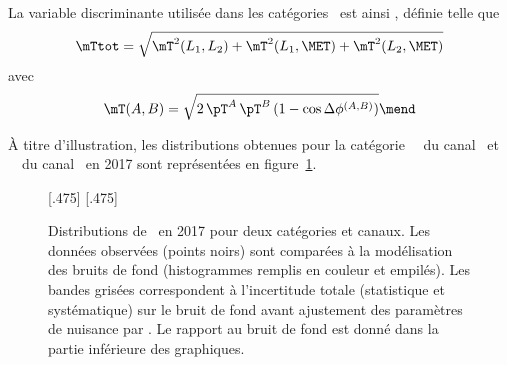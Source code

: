 \par
La variable discriminante utilisée dans les catégories \CATbsm\ est ainsi \mTtot, définie telle que
\begin{equation}
\mTtot = \sqrt{\mT^2 (L_1,L_2) + \mT^2 (L_1,\MET) + \mT^2 (L_2,\MET)}
\label{eq-def_mTtot}
\end{equation}
avec
\begin{equation}
\mT (A,B) = \sqrt{2 \, \pT^{A} \, \pT^{B} \, (1-\cos\Delta\phi^{(A,B)})}
\mend
\end{equation}
\par
À titre d'illustration, les distributions obtenues pour la catégorie \CATbtag\ \CATtightmt\ du canal \mu\tauh\ et \CATbtag\ \CATmediumdz\ du canal \ele\mu\ en 2017 sont représentées en figure~\ref{fig-mTtot_distribs_exemple}.
\begin{figure}[h]
\centering

[.475\textwidth]
{}
\hfill
{}[.475\textwidth]
{}

\caption[Distributions de \mTtot\ en 2017 pour deux catégories et canaux.]{Distributions de \mTtot\ en 2017 pour deux catégories et canaux. Les données observées (points noirs) sont comparées à la modélisation des bruits de fond (histogrammes remplis en couleur et empilés). Les bandes grisées correspondent à l'incertitude totale (statistique et systématique) sur le bruit de fond avant ajustement des paramètres de nuisance par \COMBINE. Le rapport au bruit de fond est donné dans la partie inférieure des graphiques.}
\label{fig-mTtot_distribs_exemple}
\end{figure}
